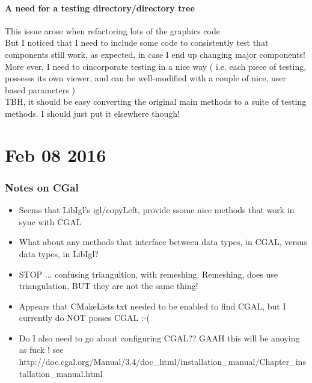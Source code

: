 \documentclass{article}
\begin{document}
\subsection{A need for a testing directory/directory tree}
This issue arose when refactoring lots of the graphics code
\\ But I noticed that I need to include some code to consistently test that components still work, as expected, in case I end up changing major components!
\\ More ever, I need to cincorporate testing in a nice way ( i.e. each piece of testing, possesss its own viewer, and can be well-modified with a couple of nice, user based parameters )
\\ TBH, it should be easy converting the original main methods to a suite of testing methods. I should just put it elsewhere though! 
\newpage

\part{Feb 08 2016}
\section{Notes on CGal}
\begin{itemize}
	\item Seems that LibIgl's igl/copyLeft, provide ssome nice methods that work in sync with CGAL
	\item What about any methods that interface between data types, in CGAL, versus data types, in LibIgl? 
	\item STOP ... confusing triangultion, with remeshing. Remeshing, does use triangulation, BUT they are not the same thing! 
	\item Appears that CMakeLists.txt needed to be enabled to find CGAL, but I currently do NOT posses CGAL :-(
	\item Do I also need to go about configuring CGAL?? GAAH this will be anoying as fuck !
		see http://doc.cgal.org/Manual/3.4/doc_html/installation_manual/Chapter_installation_manual.html
\end{itemize}
\end{document}
